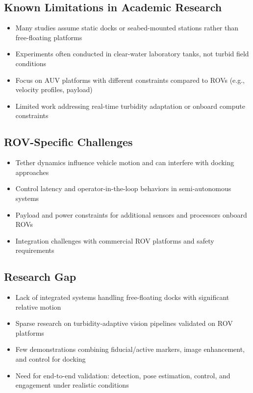\subsection{Known Limitations in Academic Research}
\begin{itemize}
    \item Many studies assume static docks or seabed-mounted stations rather than free-floating platforms
    \item Experiments often conducted in clear-water laboratory tanks, not turbid field conditions
    \item Focus on AUV platforms with different constraints compared to ROVs (e.g., velocity profiles, payload)
    \item Limited work addressing real-time turbidity adaptation or onboard compute constraints
\end{itemize}

\subsection{ROV-Specific Challenges}
\begin{itemize}
    \item Tether dynamics influence vehicle motion and can interfere with docking approaches
    \item Control latency and operator-in-the-loop behaviors in semi-autonomous systems
    \item Payload and power constraints for additional sensors and processors onboard ROVs
    \item Integration challenges with commercial ROV platforms and safety requirements
\end{itemize}

\subsection{Research Gap}
\begin{itemize}
    \item Lack of integrated systems handling free-floating docks with significant relative motion
    \item Sparse research on turbidity-adaptive vision pipelines validated on ROV platforms
    \item Few demonstrations combining fiducial/active markers, image enhancement, and control for docking
    \item Need for end-to-end validation: detection, pose estimation, control, and engagement under realistic conditions
\end{itemize}


